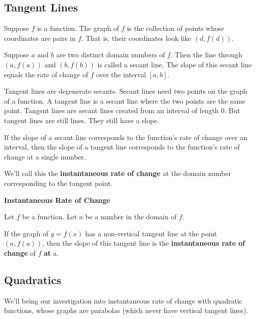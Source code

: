 \documentclass{ximera}
\begin{document}
\subsection{Tangent Lines}

Suppose $f$ is a function.  The graph of $f$ is the collection of points whose coordinates are pairs in $f$.  That is, their coordinates look like $(d, f(d))$.

Suppose $a$ and $b$ are two distinct domain numbers of $f$.  Then the line through $(a, f(a))$ and $(b, f(b))$ is called a secant line.  The slope of this secant line equals the rate of change of $f$ over the interval $[a, b]$.

Tangent lines are degenerate secants. Secant lines need two points on the graph of a function.  A tangent line is a secant line where the two points are the same point. Tangent lines are secant lines created from an interval of length $0$.  But tangent lines are still lines.  They still have a slope.


If the slope of a secant line corresponds to the function's rate of change over an interval, then the slope of a tangent line corresponds to the function's rate of change at a single number.


We'll call this the \textbf{\textcolor{purple!85!blue}{instantaneous rate of change}} at the domain number corresponding to the tangent point.




\begin{definition} \textbf{\textcolor{green!50!black}{Instantaneous Rate of Change}}  


Let $f$ be a function. Let $a$ be a number in the domain of $f$.

If the graph of $y = f(x)$ has a non-vertical tangent line at the point $(a, f(a))$, then the slope of this tangent line is the \textbf{instantaneous rate of change} of $f$ \textbf{at} a.


\end{definition}






\subsection{Quadratics}

We'll being our investigation into instantaneous rate of change with quadratic functions, whose graphs are parabolas (which never have vertical tangent lines). \\
\end{document}
